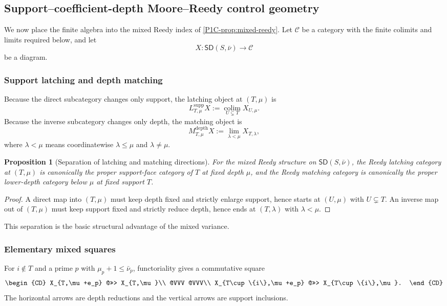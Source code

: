 \documentclass[11pt]{article}
\newtheorem{proposition}[theorem]{Proposition}
\theoremstyle{remark}
\providecommand{\colim}{\operatorname*{colim}}
\providecommand{\limop}{\operatorname*{lim}}
\providecommand{\SD}{\mathsf{SD}}
\begin{document}
\subsection{Support--coefficient-depth Moore--Reedy control geometry}

We now place the finite algebra into the mixed Reedy index of \cref{P1C-prop:mixed-reedy}.  Let \(\mathcal C\) be a category with the finite colimits and limits required below, and let
\[
 X:\SD(S,\bar\nu)\longrightarrow\mathcal C
\]
be a diagram.

\subsubsection{Support latching and depth matching}

Because the direct subcategory changes only support, the latching object at \((T,\mu)\) is
\[
 \boxed{
 L^{\mathrm{supp}}_{T,\mu}X
 :=\colim_{U\subsetneq T}X_{U,\mu}.}
\]
Because the inverse subcategory changes only depth, the matching object is
\[
 \boxed{
 M^{\mathrm{depth}}_{T,\mu}X
 :=\limop_{\lambda<\mu}X_{T,\lambda},}
\]
where \(\lambda<\mu\) means coordinatewise \(\lambda\le\mu\) and \(\lambda\ne\mu\).

\begin{proposition}[Separation of latching and matching directions]\label{P1C-prop:latch-match-separation}
For the mixed Reedy structure on \(\SD(S,\bar\nu)\), the Reedy latching category at \((T,\mu)\) is canonically the proper support-face category of \(T\) at fixed depth \(\mu\), and the Reedy matching category is canonically the proper lower-depth category below \(\mu\) at fixed support \(T\).
\end{proposition}

\begin{proof}
A direct map into \((T,\mu)\) must keep depth fixed and strictly enlarge support, hence starts at \((U,\mu)\) with \(U\subsetneq T\).  An inverse map out of \((T,\mu)\) must keep support fixed and strictly reduce depth, hence ends at \((T,\lambda)\) with \(\lambda<\mu\).
\end{proof}

This separation is the basic structural advantage of the mixed variance.

\subsubsection{Elementary mixed squares}

For \(i\notin T\) and a prime \(p\) with \(\mu_p+1\le\bar\nu_p\), functoriality gives a commutative square
\[
 \begin{CD}
 X_{T,\mu+e_p} @>>> X_{T,\mu}\\
 @VVV @VVV\\
 X_{T\cup\{i\},\mu+e_p} @>>> X_{T\cup\{i\},\mu}.
 \end{CD}
\]
The horizontal arrows are depth reductions and the vertical arrows are support inclusions.
\end{document}
